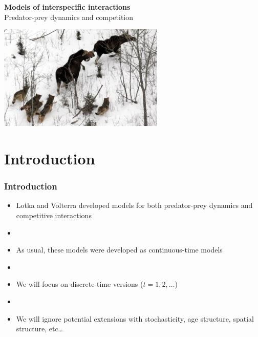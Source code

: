 \documentclass[color=usenames,dvipsnames]{beamer}\usepackage[]{graphicx}\usepackage[]{color}
\begin{document}
\begin{frame}[plain]
  \begin{center}
    {\LARGE {\color{Black} \bf Models of interspecific interactions} \\
      \LARGE {\color{Black} Predator-prey dynamics and
        competition} \par}
    \vspace{0.5cm}
    \vfill
      \includegraphics[height=5cm,keepaspectratio]{figs/isle-royale1} \\
  \end{center}
\end{frame}




\section{Introduction}




\begin{frame}
  \frametitle{Introduction}
  \large
  \begin{itemize}%
    \item<1-> Lotka and Volterra developed models for both predator-prey
      dynamics and competitive interactions
    \item[]
    \item<2-> As usual, these models were developed as
      continuous-time models
    \item[]
    \item<3-> We will focus on discrete-time versions ($t = 1, 2, \ldots$)
    \item[]
    \item<4-> We will ignore potential extensions with stochasticity, age
      structure, spatial structure, etc\dots
  \end{itemize}
\end{frame}
\end{document}
